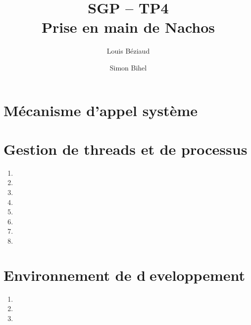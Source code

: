 \documentclass{article}
\title{SGP -- TP4\\Prise en main de Nachos}
\author{Louis Béziaud \and Simon Bihel}
\begin{document}
\maketitle

\section{Mécanisme d'appel système}

\section{Gestion de threads et de processus}

\begin{enumerate}
\item
\item
\item
\item
\item
\item
\item
\item
\end{enumerate}

\section{Environnement de developpement}

\begin{enumerate}
\item
\item
\item
\end{enumerate}
\end{document}

